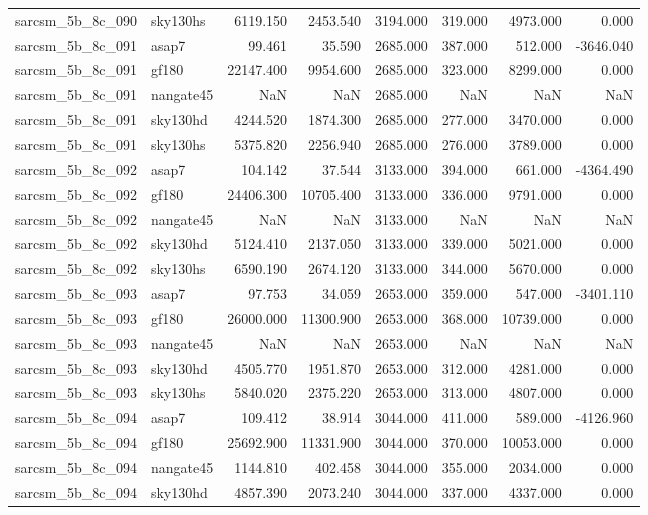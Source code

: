 \begin{tabular}{llrrrrrr}
sarcsm\_5b\_8c\_090 & sky130hs & 6119.150 & 2453.540 & 3194.000 & 319.000 & 4973.000 & 0.000 \\
sarcsm\_5b\_8c\_091 & asap7 & 99.461 & 35.590 & 2685.000 & 387.000 & 512.000 & -3646.040 \\
sarcsm\_5b\_8c\_091 & gf180 & 22147.400 & 9954.600 & 2685.000 & 323.000 & 8299.000 & 0.000 \\
sarcsm\_5b\_8c\_091 & nangate45 & NaN & NaN & 2685.000 & NaN & NaN & NaN \\
sarcsm\_5b\_8c\_091 & sky130hd & 4244.520 & 1874.300 & 2685.000 & 277.000 & 3470.000 & 0.000 \\
sarcsm\_5b\_8c\_091 & sky130hs & 5375.820 & 2256.940 & 2685.000 & 276.000 & 3789.000 & 0.000 \\
sarcsm\_5b\_8c\_092 & asap7 & 104.142 & 37.544 & 3133.000 & 394.000 & 661.000 & -4364.490 \\
sarcsm\_5b\_8c\_092 & gf180 & 24406.300 & 10705.400 & 3133.000 & 336.000 & 9791.000 & 0.000 \\
sarcsm\_5b\_8c\_092 & nangate45 & NaN & NaN & 3133.000 & NaN & NaN & NaN \\
sarcsm\_5b\_8c\_092 & sky130hd & 5124.410 & 2137.050 & 3133.000 & 339.000 & 5021.000 & 0.000 \\
sarcsm\_5b\_8c\_092 & sky130hs & 6590.190 & 2674.120 & 3133.000 & 344.000 & 5670.000 & 0.000 \\
sarcsm\_5b\_8c\_093 & asap7 & 97.753 & 34.059 & 2653.000 & 359.000 & 547.000 & -3401.110 \\
sarcsm\_5b\_8c\_093 & gf180 & 26000.000 & 11300.900 & 2653.000 & 368.000 & 10739.000 & 0.000 \\
sarcsm\_5b\_8c\_093 & nangate45 & NaN & NaN & 2653.000 & NaN & NaN & NaN \\
sarcsm\_5b\_8c\_093 & sky130hd & 4505.770 & 1951.870 & 2653.000 & 312.000 & 4281.000 & 0.000 \\
sarcsm\_5b\_8c\_093 & sky130hs & 5840.020 & 2375.220 & 2653.000 & 313.000 & 4807.000 & 0.000 \\
sarcsm\_5b\_8c\_094 & asap7 & 109.412 & 38.914 & 3044.000 & 411.000 & 589.000 & -4126.960 \\
sarcsm\_5b\_8c\_094 & gf180 & 25692.900 & 11331.900 & 3044.000 & 370.000 & 10053.000 & 0.000 \\
sarcsm\_5b\_8c\_094 & nangate45 & 1144.810 & 402.458 & 3044.000 & 355.000 & 2034.000 & 0.000 \\
sarcsm\_5b\_8c\_094 & sky130hd & 4857.390 & 2073.240 & 3044.000 & 337.000 & 4337.000 & 0.000 \\

\end{tabular}
